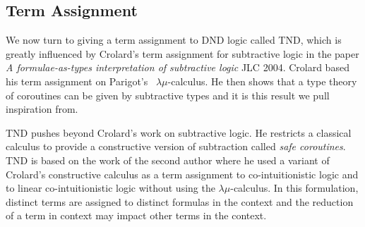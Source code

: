 \documentclass{lmcs}
\begin{document}
\subsection{Term Assignment}
\label{sec:term_assignment}
We now turn to giving a term assignment to DND logic called TND, which
is greatly influenced by Crolard's %
 term assignment for subtractive logic in the paper 
 \emph{A formulae-as-types
  interpretation of subtractive logic} JLC 2004. Crolard based his term assignment on
Parigot's~\cite{Parigot:1992} $\lambda\mu$-calculus.  He then shows
that a type theory of coroutines can be given by subtractive types 
and it is this result we pull inspiration from. 

TND pushes beyond Crolard's work on subtractive logic. He restricts a
classical calculus to provide a constructive version of subtraction
called \emph{safe coroutines}. TND is based on the work of the second
author where he used a variant of Crolard's constructive calculus as a
term assignment to co-intuitionistic logic and to linear
co-intuitionistic logic \cite{Bellin:2012} without using the
$\lambda\mu$-calculus. In this formulation, distinct terms are
assigned to distinct formulas in the context and the reduction of a
term in context may impact other terms in the context.
\end{document}
